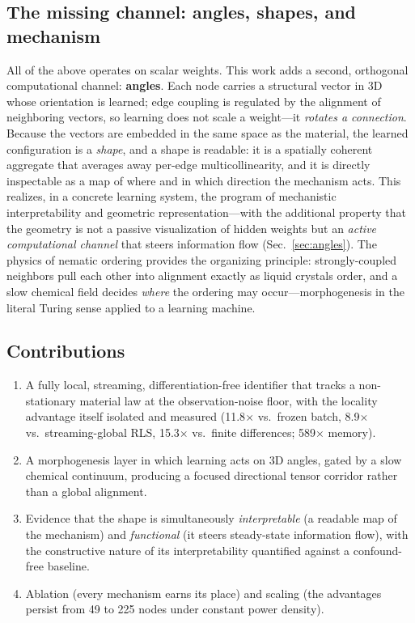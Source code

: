 \documentclass[11pt]{article}
\begin{document}
\subsection{The missing channel: angles, shapes, and mechanism}
All of the above operates on scalar weights. This work adds a second, orthogonal
computational channel: \textbf{angles}. Each node carries a structural vector in 3D
whose orientation is learned; edge coupling is regulated by the alignment of neighboring
vectors, so learning does not scale a weight---it \emph{rotates a connection}. Because
the vectors are embedded in the same space as the material, the learned configuration is
a \emph{shape}, and a shape is readable: it is a spatially coherent aggregate that
averages away per-edge multicollinearity, and it is directly inspectable as a map of
where and in which direction the mechanism acts. This realizes, in a concrete learning
system, the program of mechanistic interpretability\cite{Olah20} and geometric
representation\cite{Bronstein21}---with the additional property that the geometry is not
a passive visualization of hidden weights but an \emph{active computational channel}
that steers information flow (Sec.~\ref{sec:angles}). The physics of nematic
ordering\cite{dGP93} provides the organizing principle: strongly-coupled neighbors pull
each other into alignment exactly as liquid crystals order, and a slow chemical field
decides \emph{where} the ordering may occur---morphogenesis in the literal Turing
sense\cite{Turing52} applied to a learning machine.

\subsection{Contributions}
\begin{enumerate}
\item A fully local, streaming, differentiation-free identifier that tracks a
non-stationary material law at the observation-noise floor, with the locality advantage
itself isolated and measured (11.8$\times$ vs.\ frozen batch, 8.9$\times$ vs.\
streaming-global RLS, 15.3$\times$ vs.\ finite differences; 589$\times$ memory).
\item A morphogenesis layer in which learning acts on 3D angles, gated by a slow
chemical continuum, producing a focused directional tensor corridor rather than a global
alignment.
\item Evidence that the shape is simultaneously \emph{interpretable} (a readable map of
the mechanism) and \emph{functional} (it steers steady-state information flow), with the
constructive nature of its interpretability quantified against a confound-free baseline.
\item Ablation (every mechanism earns its place) and scaling (the advantages persist
from 49 to 225 nodes under constant power density).
\end{enumerate}
\end{document}
